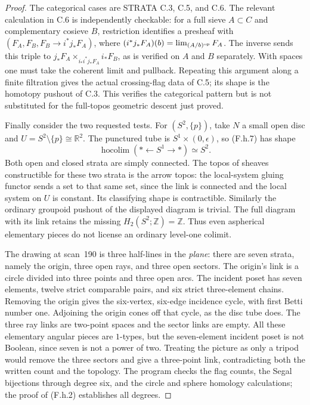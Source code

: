 \begin{proof}
The categorical cases are STRATA C.3, C.5, and C.6. The relevant
calculation in C.6 is independently checkable: for a full sieve
$A\subset C$ and complementary cosieve $B$, restriction identifies a
presheaf with $(F_A,F_B,F_B\to i^*j_*F_A)$, where
$(i^*j_*F_A)(b)=\lim_{(A/b)^{\rm op}}F_A$. The inverse sends this
triple to $j_*F_A\times_{i_*i^*j_*F_A}i_*F_B$, as is verified on
$A$ and $B$ separately. With spaces one must take the coherent limit
and pullback. Repeating this argument along a finite filtration gives
the actual crossing-flag data of C.5; its shape is the homotopy
pushout of C.3. This verifies the categorical pattern but is not
substituted for the full-topos geometric descent just proved.

Finally consider the two requested tests. For $(S^2,\{p\})$, take
$N$ a small open disc and $U=S^2\setminus\{p\}\cong\mathbb R^2$.
The punctured tube is $S^1\times(0,\epsilon)$, so (F.h.7) has shape
\[
 \operatorname{hocolim}(*\leftarrow S^1\longrightarrow *)\simeq S^2.
\]
Both open and closed strata are simply connected. The topos of sheaves
constructible for these two strata is the arrow topos: the local-system
gluing functor sends a set to that same set, since the link is connected
and the local system on $U$ is constant. Its classifying shape is
contractible. Similarly the ordinary groupoid pushout of the displayed
diagram is trivial. The full diagram with its link retains the missing
$H_2(S^2;\mathbb Z)=\mathbb Z$. Thus even aspherical elementary
pieces do not license an ordinary level-one colimit.

The drawing at scan~190 is three half-lines in the \emph{plane}:
there are seven strata, namely the origin, three open rays, and three
open sectors. The origin's link is a circle divided into three points
and three open arcs. The incident poset has seven elements, twelve
strict comparable pairs, and six strict three-element chains. Removing
the origin gives the six-vertex, six-edge incidence cycle, with first
Betti number one. Adjoining the origin cones off that cycle, as the
disc tube does. The three ray links are two-point spaces and the
sector links are empty. All these elementary angular pieces are
$1$-types, but the seven-element incident poset is not Boolean, since
seven is not a power of two. Treating the picture as only a tripod
would remove the three sectors and give a three-point link, contradicting
both the written count and the topology. The program checks the flag
counts, the Segal bijections through degree six, and the circle and
sphere homology calculations; the proof of (F.h.2) establishes all
degrees.
\end{proof}


